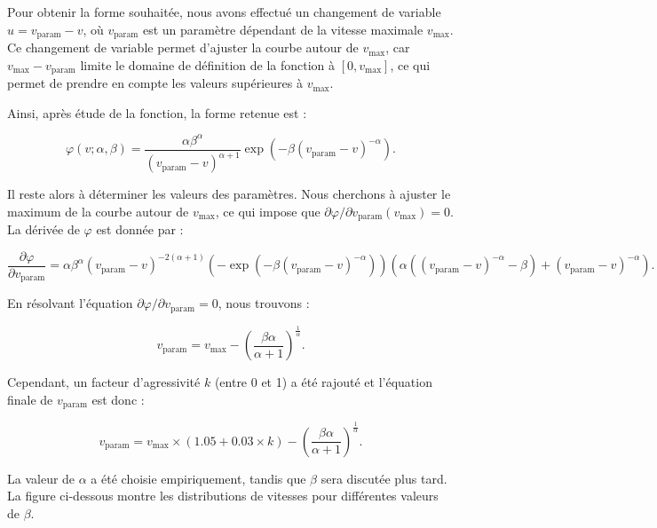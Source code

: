 \documentclass{article}
\begin{document}
Pour obtenir la forme souhaitée, nous avons effectué un changement de variable \(u = v_{\text{param}} - v\), où \(v_{\text{param}}\) est un paramètre dépendant de la vitesse maximale \(v_{\text{max}}\). Ce changement de variable permet d'ajuster la courbe autour de \(v_{\text{max}}\), car \(v_{\text{max}} - v_{\text{param}}\) limite le domaine de définition de la fonction à \([0, v_{\text{max}}]\), ce qui permet de prendre en compte les valeurs supérieures à \(v_{\text{max}}\).

Ainsi, après étude de la fonction, la forme retenue est :

\[ 
\varphi(v; \alpha, \beta) = \frac{\alpha \beta^\alpha}{(v_{\text{param}} - v)^{\alpha + 1}} \exp\left(-\beta (v_{\text{param}} - v)^{-\alpha}\right).
\]

Il reste alors à déterminer les valeurs des paramètres. Nous cherchons à ajuster le maximum de la courbe autour de \(v_{\text{max}}\), ce qui impose que \(\partial \varphi / \partial v_{\text{param}} (v_{\text{max}}) = 0\). La dérivée de \(\varphi\) est donnée par :

\[ 
\frac{\partial \varphi}{\partial v_{\text{param}}} = \alpha \beta^\alpha (v_{\text{param}} - v)^{-2(\alpha + 1)} \left( -\exp\left(-\beta (v_{\text{param}} - v)^{-\alpha}\right) \right) \left( \alpha ((v_{\text{param}} - v)^{-\alpha} - \beta) + (v_{\text{param}} - v)^{-\alpha} \right).
\]

En résolvant l'équation \(\partial \varphi / \partial v_{\text{param}} = 0\), nous trouvons :

\[ 
v_{\text{param}} = v_{\text{max}} - \left( \frac{\beta \alpha}{\alpha + 1} \right)^{\frac{1}{\alpha}}.
\]

Cependant, un facteur d'agressivité \(k\) (entre 0 et 1) a été rajouté et l'équation finale de \(v_{\text{param}}\) est donc :

\[ 
v_{\text{param}} = v_{\text{max}} \times (1.05 + 0.03 \times k) - \left( \frac{\beta \alpha}{\alpha + 1} \right)^{\frac{1}{\alpha}}.
\]

La valeur de \(\alpha\) a été choisie empiriquement, tandis que \(\beta\) sera discutée plus tard. La figure ci-dessous montre les distributions de vitesses pour différentes valeurs de \(\beta\).
\end{document}

